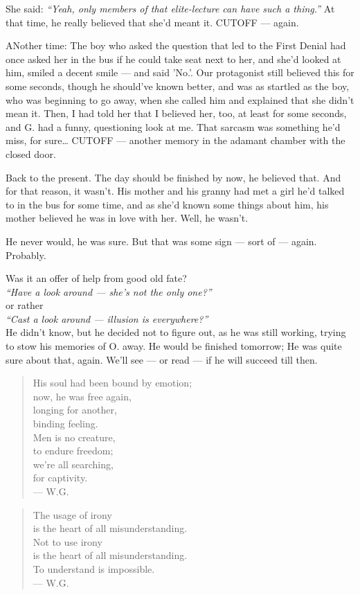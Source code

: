 She said: \emph{\enquote{Yeah, only members of that elite-lecture can have such a thing.}}
At that time, he really believed that she'd meant it. 
CUTOFF --- again.

ANother time: The boy who asked the question that led to the First Denial had once asked her in the bus if he could take seat next to her, and she'd looked at him, smiled a decent smile --- and said 'No.'.
Our protagonist still believed this for some seconds, though he should've known better, and was as startled as the boy, who was beginning to go away, when she called him and explained that she didn't mean it. Then, I had told her that I believed her, too, at least for some seconds, and G. had a funny, questioning look at me. 
That sarcasm was something he'd miss, for sure\ldots
CUTOFF --- another memory in the adamant chamber with the closed door.

Back to the present. 
The day should be finished by now, he believed that. 
And for that reason, it wasn't. 
His mother and his granny had met a girl he'd talked to in the bus for some time, and as she'd known some things about him, his mother believed he was in love with her. 
Well, he wasn't. 

He never would, he was sure. 
But that was some sign --- sort of --- again. 
Probably.

Was it an offer of help from good old fate?\\
\emph{\enquote{Have a look around --- she's not the only one?}}\\
    or rather\\
\emph{\enquote{Cast a look around --- illusion is everywhere?}}\\
He didn't know, but he decided not to figure out, as he was still working, trying to stow his memories of O. away. 
He would be finished tomorrow; He was quite sure about that, again. 
We'll see --- or read --- if he will succeed till then. 

\begin{quote}
His soul had been bound by emotion;\\
now, he was free again,\\
longing for another,\\
binding feeling. \\
Men is no creature,\\
to endure freedom;\\
we're all searching,\\
for captivity. \\
--- W.G.
\end{quote}

\begin{quote}
The usage of irony\\
is the heart of all misunderstanding. \\
Not to use irony\\
is the heart of all misunderstanding. \\
To understand is impossible. \\
--- W.G.
\end{quote}
